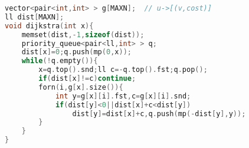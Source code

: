 \begin{lstlisting}[language=C++]
vector<pair<int,int> > g[MAXN];  // u->[(v,cost)]
ll dist[MAXN];
void dijkstra(int x){
	memset(dist,-1,sizeof(dist));
	priority_queue<pair<ll,int> > q;
	dist[x]=0;q.push(mp(0,x));
	while(!q.empty()){
		x=q.top().snd;ll c=-q.top().fst;q.pop();
		if(dist[x]!=c)continue;
		forn(i,g[x].size()){
			int y=g[x][i].fst,c=g[x][i].snd;
			if(dist[y]<0||dist[x]+c<dist[y])
				dist[y]=dist[x]+c,q.push(mp(-dist[y],y));
		}
	}
}
\end{lstlisting}